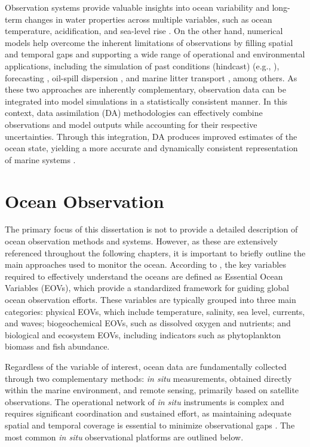 Observation systems provide valuable insights into ocean variability and long-term changes in water properties across multiple variables, such as ocean temperature, acidification, and sea-level rise \parencite{frederikse2020causes, vonschuckmann2025global}. On the other hand, numerical models help overcome the inherent limitations of observations by filling spatial and temporal gaps and supporting a wide range of operational and environmental applications, including the simulation of past conditions (hindcast) (e.g., \textcite{sasaki2020global}), forecasting \parencite{cima2024soma}, oil-spill dispersion \parencite{janeiro2017integrating}, and marine litter transport \parencite{rosas2022pathways}, among others. As these two approaches are inherently complementary, observation data can be integrated into model simulations in a statistically consistent manner. In this context, data assimilation (DA) methodologies can effectively combine observations and model outputs while accounting for their respective uncertainties. Through this integration, DA produces improved estimates of the ocean state, yielding a more accurate and dynamically consistent representation of marine systems \parencite{martin2025data, carrassi2018data}.

\section{Ocean Observation}
The primary focus of this dissertation is not to provide a detailed description of ocean observation methods and systems. However, as these are extensively referenced throughout the following chapters, it is important to briefly outline the main approaches used to monitor the ocean. According to \textcite{miguez2026goos}, the key variables required to effectively understand the oceans are defined as Essential Ocean Variables (EOVs), which provide a standardized framework for guiding global ocean observation efforts. These variables are typically grouped into three main categories: physical EOVs, which include temperature, salinity, sea level, currents, and waves; biogeochemical EOVs, such as dissolved oxygen and nutrients; and biological and ecosystem EOVs, including indicators such as phytoplankton biomass and fish abundance.

Regardless of the variable of interest, ocean data are fundamentally collected through two complementary methods: \emph{in situ} measurements, obtained directly within the marine environment, and remote sensing, primarily based on satellite observations. The operational network of \emph{in situ} instruments is complex and requires significant coordination and sustained effort, as maintaining adequate spatial and temporal coverage is essential to minimize observational gaps \parencite{legler2015current}. The most common \emph{in situ} observational platforms are outlined below.


